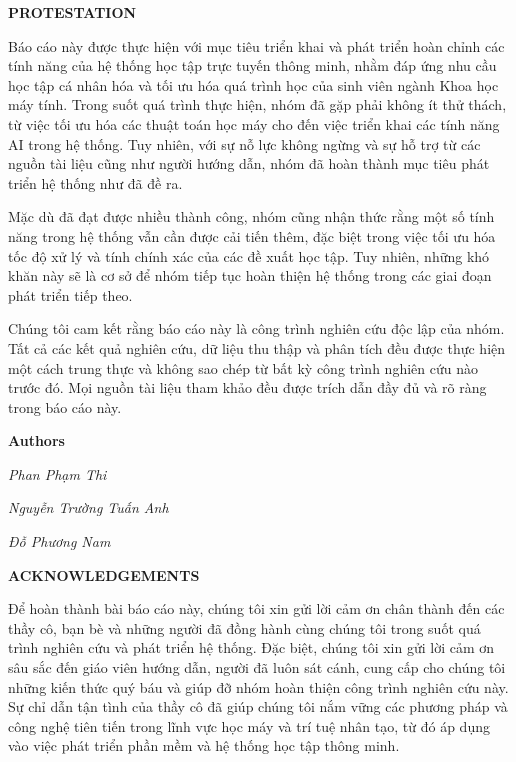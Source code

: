 \documentclass[12pt,a4paper]{report}
\theoremstyle{definition}
\begin{document}
\newpage
\begin{center}
    \textbf{\Large PROTESTATION} \par
\end{center}
Báo cáo này được thực hiện với mục tiêu triển khai và phát triển hoàn chỉnh các tính năng của hệ thống học tập trực tuyến thông minh, nhằm đáp ứng nhu cầu học tập cá nhân hóa và tối ưu hóa quá trình học của sinh viên ngành Khoa học máy tính. Trong suốt quá trình thực hiện, nhóm đã gặp phải không ít thử thách, từ việc tối ưu hóa các thuật toán học máy cho đến việc triển khai các tính năng AI trong hệ thống. Tuy nhiên, với sự nỗ lực không ngừng và sự hỗ trợ từ các nguồn tài liệu cũng như người hướng dẫn, nhóm đã hoàn thành mục tiêu phát triển hệ thống như đã đề ra.

Mặc dù đã đạt được nhiều thành công, nhóm cũng nhận thức rằng một số tính năng trong hệ thống vẫn cần được cải tiến thêm, đặc biệt trong việc tối ưu hóa tốc độ xử lý và tính chính xác của các đề xuất học tập. Tuy nhiên, những khó khăn này sẽ là cơ sở để nhóm tiếp tục hoàn thiện hệ thống trong các giai đoạn phát triển tiếp theo.

Chúng tôi cam kết rằng báo cáo này là công trình nghiên cứu độc lập của nhóm. Tất cả các kết quả nghiên cứu, dữ liệu thu thập và phân tích đều được thực hiện một cách trung thực và không sao chép từ bất kỳ công trình nghiên cứu nào trước đó. Mọi nguồn tài liệu tham khảo đều được trích dẫn đầy đủ và rõ ràng trong báo cáo này.
\par\hfill\textbf{Authors}\hspace{1cm}

\par\hfill\textit{Phan Phạm Thi}\hspace{0.3cm}
\par\hfill\textit{Nguyễn Trường Tuấn Anh}\hspace{0.2cm}\par\hfill\textit{Đỗ Phương Nam}
\newpage

\begin{center}
    \textbf{\Large ACKNOWLEDGEMENTS} \par
\end{center}
Để hoàn thành bài báo cáo này, chúng tôi xin gửi lời cảm ơn chân thành đến các thầy cô, bạn bè và những người đã đồng hành cùng chúng tôi trong suốt quá trình nghiên cứu và phát triển hệ thống. Đặc biệt, chúng tôi xin gửi lời cảm ơn sâu sắc đến giáo viên hướng dẫn, người đã luôn sát cánh, cung cấp cho chúng tôi những kiến thức quý báu và giúp đỡ nhóm hoàn thiện công trình nghiên cứu này. Sự chỉ dẫn tận tình của thầy cô đã giúp chúng tôi nắm vững các phương pháp và công nghệ tiên tiến trong lĩnh vực học máy và trí tuệ nhân tạo, từ đó áp dụng vào việc phát triển phần mềm và hệ thống học tập thông minh.
\end{document}
